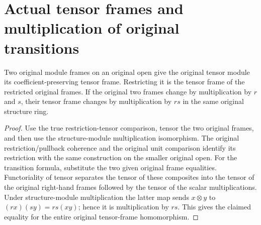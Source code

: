 \section{Actual tensor frames and multiplication of original transitions}

\begin{lemma}
\label{lem:scheme-original-tensor-frame-transitions}
\leanok
Two original module frames on an original open give the original tensor
module its coefficient-preserving tensor frame. Restricting it is the
tensor frame of the restricted original frames. If the original two
frames change by multiplication by $r$ and $s$, their tensor frame
changes by multiplication by $rs$ in the same original structure ring.
\end{lemma}
\begin{proof}
Use the true restriction-tensor comparison, tensor the two original
frames, and then use the structure-module multiplication isomorphism.
The original restriction/pullback coherence and the original unit
comparison identify its restriction with the same construction on the
smaller original open. For the transition formula, substitute the two
given original frame equalities. Functoriality of tensor separates the
tensor of these composites into the tensor of the original right-hand
frames followed by the tensor of the scalar multiplications. Under
structure-module multiplication the latter map sends $x\otimes y$ to
$(rx)(sy)=rs(xy)$; hence it is multiplication by $rs$. This gives the
claimed equality for the entire original tensor-frame homomorphism.
\end{proof}
